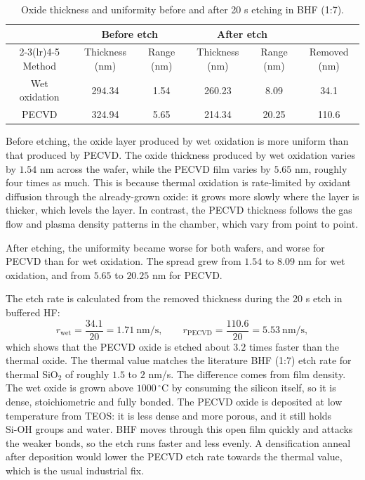 \begin{table}[htbp]
  \centering
  \caption{Oxide thickness and uniformity before and after 20 s etching in BHF (1:7).}
  \label{tab:ch4-oxide}
  \begin{tabular}{cccccc}
    \toprule
     & \multicolumn{2}{c}{Before etch} & \multicolumn{2}{c}{After etch} & \\
    \cmidrule(lr){2-3}\cmidrule(lr){4-5}
    Method & Thickness (nm) & Range (nm) & Thickness (nm) & Range (nm) & Removed (nm) \\
    \midrule
    Wet oxidation & 294.34 & 1.54 & 260.23 &  8.09 &  34.1 \\
    PECVD         & 324.94 & 5.65 & 214.34 & 20.25 & 110.6 \\
    \bottomrule
  \end{tabular}
\end{table}

Before etching, the oxide layer produced by wet oxidation is more uniform than that produced by PECVD. The oxide thickness produced by wet oxidation varies by $1.54$ nm across the wafer, while the PECVD film varies by $5.65$ nm, roughly four times as much. This is because thermal oxidation is rate-limited by oxidant diffusion through the already-grown oxide: it grows more slowly where the layer is thicker, which levels the layer. In contrast, the PECVD thickness follows the gas flow and plasma density patterns in the chamber, which vary from point to point.

After etching, the uniformity became worse for both wafers, and worse for PECVD than for wet oxidation. The spread grew from $1.54$ to $8.09$ nm for wet oxidation, and from $5.65$ to $20.25$ nm for PECVD.

The etch rate is calculated from the removed thickness during the 20 s etch in buffered HF:
\begin{equation}
  r_\mathrm{wet} = \frac{34.1}{20} = 1.71~\mathrm{nm/s},
  \qquad
  r_\mathrm{PECVD} = \frac{110.6}{20} = 5.53~\mathrm{nm/s},
  \label{eq:etch-rates}
\end{equation}
which shows that the PECVD oxide is etched about $3.2$ times faster than the thermal oxide. The thermal value matches the literature BHF (1:7) etch rate for thermal SiO$_2$ of roughly $1.5$ to $2$ nm/s. The difference comes from film density. The wet oxide is grown above $1000\,^\circ$C by consuming the silicon itself, so it is dense, stoichiometric and fully bonded. The PECVD oxide is deposited at low temperature from TEOS: it is less dense and more porous, and it still holds $\mathrm{Si\text{-}OH}$ groups and water. BHF moves through this open film quickly and attacks the weaker bonds, so the etch runs faster and less evenly. A densification anneal after deposition would lower the PECVD etch rate towards the thermal value, which is the usual industrial fix.


